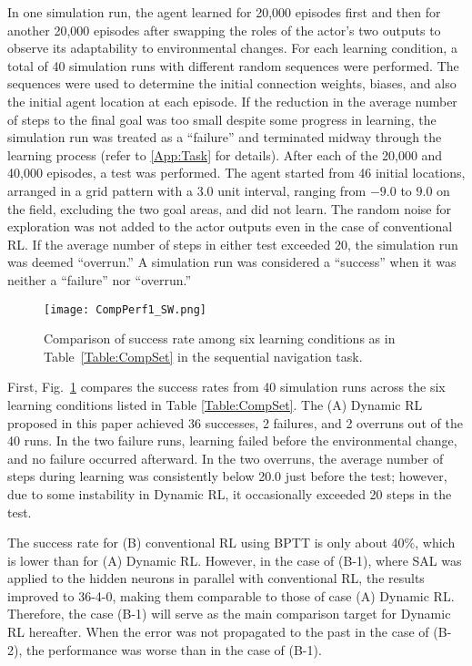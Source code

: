 In one simulation run, the agent learned for 20,000 episodes first and then for another 20,000 episodes
after swapping the roles of the actor's two outputs to observe its adaptability to environmental changes.
For each learning condition, a total of 40 simulation runs with different random sequences were performed.
The sequences were used to determine the initial connection weights, biases, and also the initial agent location at each episode.
If the reduction in the average number of steps to the final goal was too small despite some progress in learning,
the simulation run was treated as a ``failure'' and terminated midway through the learning process (refer to \ref{App:Task} for details).
After each of the 20,000 and 40,000 episodes, a test was performed.
The agent started from 46 initial locations, arranged in a grid pattern with a 3.0 unit interval,
ranging from $-9.0$ to $9.0$ on the field, excluding the two goal areas, and did not learn. 
The random noise for exploration was not added to the actor outputs even in the case of conventional RL.
If the average number of steps in either test exceeded 20, the simulation run was deemed ``overrun.''
A simulation run was considered a ``success'' when it was neither a ``failure'' nor ``overrun.''

\begin{figure}[t]
\centerline{\texttt{[image: CompPerf1\_SW.png]}}
\caption{Comparison of success rate among six learning conditions as in Table~\ref{Table:CompSet}
in the sequential navigation task.}
\label{fig:CompPerf1_SW}
\end{figure}
First, Fig.~\ref{fig:CompPerf1_SW} compares the success rates from 40 simulation runs
across the six learning conditions listed in Table \ref{Table:CompSet}.
The (A) Dynamic RL proposed in this paper achieved 36 successes, 2 failures, and 2 overruns out of the 40 runs.
In the two failure runs, learning failed before the environmental change, and no failure occurred afterward.
In the two overruns, the average number of steps during learning was consistently below 20.0 just before the test;
however, due to some instability in Dynamic RL, it occasionally exceeded 20 steps in the test.

The success rate for (B) conventional RL using BPTT is only about 40\%, which is lower than for (A) Dynamic RL.
However, in the case of (B-1), where SAL was applied to the hidden neurons in parallel with conventional RL,
the results improved to 36-4-0, making them comparable to those of case (A) Dynamic RL.
Therefore, the case (B-1) will serve as the main comparison target for Dynamic RL hereafter.
When the error was not propagated to the past in the case of (B-2),  
the performance was worse than in the case of (B-1).

